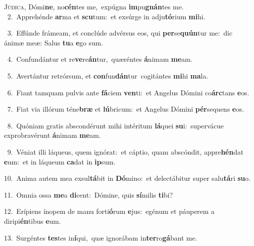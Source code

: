 \lettrine{\initial\textcolor{\initialcolor}{J}}{údica,} Dómi\-\textbf{ne}\-, no\-\textbf{cén}\-tes me,~\star expúgna \textbf{im}\-pu\-\textbf{gnán}\-tes me.\\
{\numbfont\textcolor{\numbcolor}{~2.}}~Apprehénde \textbf{ar}\-ma et \textbf{scu}\-tum:~\star et exsúrge in adju\-\textbf{tó}\-rium \textbf{mi}\-hi.\par
{\numbfont\textcolor{\numbcolor}{~3.}}~Effúnde frámeam, et conclúde advérsus eos, qui \textbf{per}\-se\-\textbf{quún}\-tur me:~\star dic ánimæ meæ: Salus \textbf{tu}\-a \textbf{e}\-go sum.\par
{\numbfont\textcolor{\numbcolor}{~4.}}~Confundántur et re\-\textbf{ve}\-re\-\textbf{án}\-tur,~\star quæréntes \textbf{á}\-nimam \textbf{me}\-am.\par
{\numbfont\textcolor{\numbcolor}{~5.}}~Avertántur retrórsum, et \textbf{con}\-fun\-\textbf{dán}\-tur~\star cogitántes \textbf{mi}\-hi \textbf{ma}\-la.\par
{\numbfont\textcolor{\numbcolor}{~6.}}~Fiant tamquam pulvis ante \textbf{fá}\-ciem \textbf{ven}\-ti:~\star et Angelus Dómini co\-\textbf{árc}\-tans \textbf{e}\-os.\par
{\numbfont\textcolor{\numbcolor}{~7.}}~Fiat via illórum téne\textbf{bræ} et \textbf{lú}\-bricum:~\star et Angelus Dómini \textbf{pér}\-sequens \textbf{e}\-os.\par
{\numbfont\textcolor{\numbcolor}{~8.}}~Quóniam gratis abscondérunt mihi intéritum \textbf{lá}\-quei \textbf{su}\-i:~\star supervácue exprobravérunt \textbf{á}\-nimam \textbf{me}\-am.\par
{\numbfont\textcolor{\numbcolor}{~9.}}~Véniat illi láqueus, quem ignórat:~\dagger et cáptio, quam abscóndit, appre\-\textbf{hén}\-dat \textbf{e}\-um:~\star et in láqueum \textbf{ca}\-dat in \textbf{ip}\-sum.\par
{\numbfont\textcolor{\numbcolor}{10.}}~Anima autem mea exsul\-\textbf{tá}\-bit in \textbf{Dó}\-mino:~\star et delectábitur super salu\-\textbf{tá}\-ri \textbf{su}\-o.\par
{\numbfont\textcolor{\numbcolor}{11.}}~Omnia ossa \textbf{me}\-a \textbf{di}\-cent:~\star Dómine, quis \textbf{sí}\-milis \textbf{ti}\-bi?\par
{\numbfont\textcolor{\numbcolor}{12.}}~Erípiens ínopem de manu forti\-\textbf{ó}\-rum \textbf{e}\-jus:~\star egénum et páuperem a diripi\-\textbf{én}\-tibus \textbf{e}\-um.\par
{\numbfont\textcolor{\numbcolor}{13.}}~Surgéntes \textbf{tes}\-tes in\-\textbf{í}\-qui,~\star quæ ignorábam in\-\textbf{ter}\-ro\-\textbf{gá}\-bant me.\par
